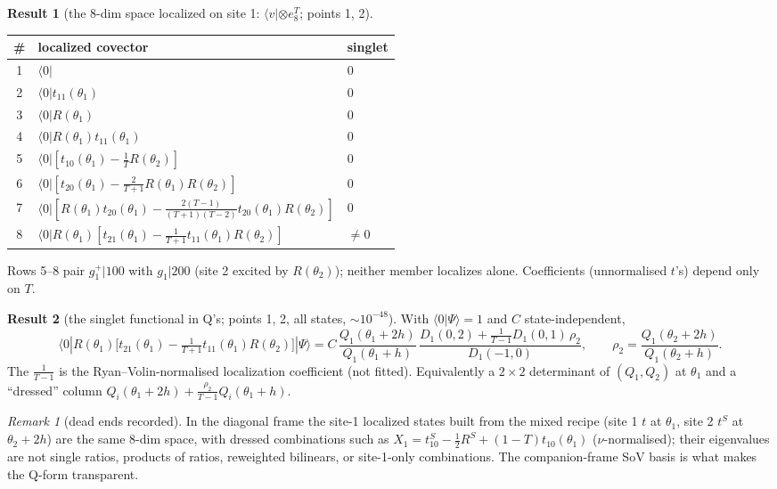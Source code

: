 \documentclass[11pt]{article}
\newcommand{\vac}{\langle 0|}
\theoremstyle{definition}
\newtheorem{result}{Result}
\theoremstyle{remark}
\newtheorem*{remark}{Remark}
\begin{document}
\begin{result}[the 8-dim space localized on site 1: $\langle v|\otimes e_8^T$; points 1, 2]
\begin{center}
\begin{tabular}{cll}\toprule
\# & localized covector & singlet\\\midrule
1 & $\vac$ & 0\\
2 & $\vac t_{11}(\theta_1)$ & 0\\
3 & $\vac R(\theta_1)$ & 0\\
4 & $\vac R(\theta_1)t_{11}(\theta_1)$ & 0\\
5 & $\vac[t_{10}(\theta_1)-\frac1T R(\theta_2)]$ & 0\\
6 & $\vac[t_{20}(\theta_1)-\frac2{T+1}R(\theta_1)R(\theta_2)]$ & 0\\
7 & $\vac[R(\theta_1)t_{20}(\theta_1)-\frac{2(T-1)}{(T+1)(T-2)}t_{20}(\theta_1)R(\theta_2)]$ & 0\\
8 & $\vac R(\theta_1)[t_{21}(\theta_1)-\frac1{T+1}t_{11}(\theta_1)R(\theta_2)]$ & $\neq0$\\\bottomrule
\end{tabular}
\end{center}
Rows 5--8 pair $g_1^+|100$ with $g_1|200$ (site 2 excited by $R(\theta_2)$); neither member localizes alone. Coefficients (unnormalised $t$'s) depend only on $T$.
\end{result}

\begin{result}[the singlet functional in Q's; points 1, 2, all states, $\sim10^{-48}$]
With $\langle 0|\Psi\rangle=1$ and $C$ state-independent,
\[
\vac R(\theta_1)\Big[t_{21}(\theta_1)-\tfrac1{T+1}t_{11}(\theta_1)R(\theta_2)\Big]|\Psi\rangle
=C\,\frac{Q_1(\theta_1+2h)}{Q_1(\theta_1+h)}\,\frac{D_1(0,2)+\frac1{T-1}D_1(0,1)\,\rho_2}{D_1(-1,0)},\qquad\rho_2=\frac{Q_1(\theta_2+2h)}{Q_1(\theta_2+h)} .
\]
The $\frac1{T-1}$ is the Ryan--Volin-normalised localization coefficient (not fitted). Equivalently a $2\times2$ determinant of $(Q_1,Q_2)$ at $\theta_1$ and a ``dressed'' column $Q_i(\theta_1+2h)+\frac{\rho_2}{T-1}Q_i(\theta_1+h)$.
\end{result}

\begin{remark}[dead ends recorded]
In the diagonal frame the site-1 localized states built from the mixed recipe (site 1 $t$ at $\theta_1$, site 2 $t^S$ at $\theta_2+2h$) are the same 8-dim space, with dressed combinations such as $X_1=t^S_{10}-\tfrac12R^S+(1-T)t_{10}(\theta_1)$ ($\nu$-normalised); their eigenvalues are not single ratios, products of ratios, reweighted bilinears, or site-1-only combinations. The companion-frame SoV basis is what makes the Q-form transparent.
\end{remark}
\end{document}
